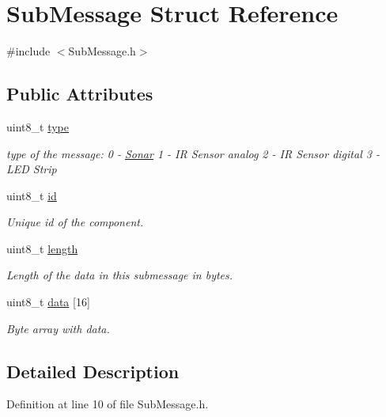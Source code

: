 \hypertarget{struct_sub_message}{}\section{Sub\+Message Struct Reference}
\label{struct_sub_message}


{\ttfamily \#include $<$Sub\+Message.\+h$>$}

\subsection*{Public Attributes}
\begin{DoxyCompactItemize}
\item 
uint8\+\_\+t \hyperlink{struct_sub_message_a064f1d26d553da776dc749d37a18a499}{type}
\begin{DoxyCompactList}\small\item\em type of the message\+: 0 -\/ \hyperlink{class_sonar}{Sonar} 1 -\/ IR Sensor analog 2 -\/ IR Sensor digital 3 -\/ L\+ED Strip \end{DoxyCompactList}\item 
uint8\+\_\+t \hyperlink{struct_sub_message_af3acc450c0686d7a9d15ccd9d548cb6d}{id}
\begin{DoxyCompactList}\small\item\em Unique id of the component. \end{DoxyCompactList}\item 
uint8\+\_\+t \hyperlink{struct_sub_message_a276e06f5335ca7857c21ac8c0e51bd6d}{length}
\begin{DoxyCompactList}\small\item\em Length of the data in this submessage in bytes. \end{DoxyCompactList}\item 
uint8\+\_\+t \hyperlink{struct_sub_message_a7d923c5cdaa380c27d7c4cf60ea7c1be}{data} \mbox{[}16\mbox{]}
\begin{DoxyCompactList}\small\item\em Byte array with data. \end{DoxyCompactList}\end{DoxyCompactItemize}


\subsection{Detailed Description}


Definition at line 10 of file Sub\+Message.\+h.



